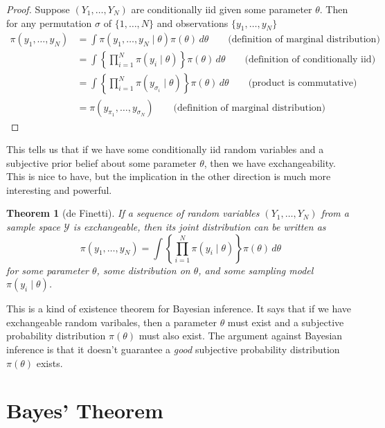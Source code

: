 \documentclass[
]{book}
\newtheorem{theorem}{Theorem}[chapter]
\theoremstyle{definition}
\theoremstyle{definition}
\theoremstyle{definition}
\theoremstyle{definition}
\theoremstyle{remark}
\begin{document}
\begin{proof}
Suppose \((Y_1, \ldots, Y_N)\) are conditionally iid given some parameter \(\theta\). Then for any permutation \(\sigma\) of \(\{1, \ldots, N\}\) and observations \(\{y_1, \ldots, y_N\}\)
\begin{equation}
\begin{split}
\pi(y_1, \ldots, y_N) &= \int \pi(y_1, \ldots, y_N \mid \theta) \pi(\theta)\, d\theta \qquad \textrm{(definition of marginal distribution)}\\
 & = \int \left\{\prod_{i=1}^N\pi(y_i \mid \theta)\right\} \pi(\theta)\, d\theta \qquad \textrm{(definition of conditionally iid)}\\
& = \int \left\{\prod_{i=1}^N\pi(y_{\sigma_i} \mid \theta)\right\} \pi(\theta)\, d\theta \qquad \textrm{(product is commutative)} \\
 & = \pi(y_{\pi_1}, \ldots, y_{\sigma_N}) \qquad \textrm{(definition of marginal distribution)}
\end{split}
\end{equation}
\end{proof}

This tells us that if we have some conditionally iid random variables and a subjective prior belief about some parameter \(\theta\), then we have exchangeability. This is nice to have, but the implication in the other direction is much more interesting and powerful.

\begin{theorem}[de Finetti]
If a sequence of random variables \((Y_1, \ldots, Y_N)\) from a sample space \(\mathcal{Y}\) is exchangeable, then its joint distribution can be written as
\[
\pi(y_1, \ldots, y_N) = \int \left\{\prod_{i=1}^N\pi(y_i \mid \theta)\right\} \pi(\theta)\, d\theta
\]
for some parameter \(\theta\), some distribution on \(\theta\), and some sampling model \(\pi(y_i \mid \theta)\).
\end{theorem}

This is a kind of existence theorem for Bayesian inference. It says that if we have exchangeable random varibales, then a parameter \(\theta\) must exist and a subjective probability distribution \(\pi(\theta)\) must also exist. The argument against Bayesian inference is that it doesn't guarantee a \emph{good} subjective probability distribution \(\pi(\theta)\) exists.

\hypertarget{bayes-theorem}{%
\section{Bayes' Theorem}\label{bayes-theorem}}
\end{document}
